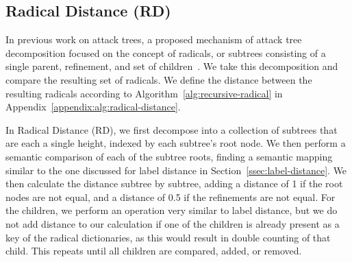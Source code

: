 



\subsection{Radical Distance (RD)}
\label{ssec:rd}

In previous work on attack trees, a proposed mechanism of attack tree decomposition focused on the concept of radicals, or subtrees consisting of a single parent, refinement, and set of children~\cite{schiele2021novel}. We take this decomposition and compare the resulting set of radicals. We define the distance between the resulting radicals according to Algorithm~\ref{alg:recursive-radical} in Appendix~\ref{appendix:alg:radical-distance}.

In Radical Distance (RD), we first decompose into a collection of subtrees that are each a single height, indexed by each subtree's root node. We then perform a semantic comparison of each of the subtree roots, finding a semantic mapping similar to the one discussed for label distance in Section~\ref{ssec:label-distance}. We then calculate the distance subtree by subtree, adding a distance of 1 if the root nodes are not equal, and a distance of 0.5 if the refinements are not equal. For the children, we perform an operation very similar to label distance, but we do not add distance to our calculation if one of the children is already present as a key of the radical dictionaries, as this would result in double counting of that child. This repeats until all children are compared, added, or removed.

